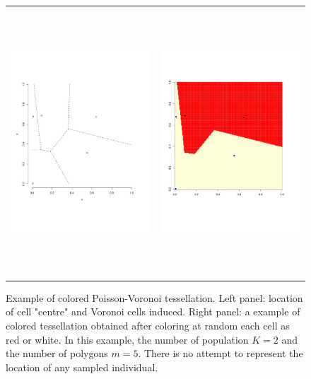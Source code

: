 \documentclass{article}
\begin{document}
\begin{figure}[h]
\vspace{-1cm}
\begin{tabular}{cc}
\vspace{-1cm}
\includegraphics[height=10cm,width=7.5cm]{../inst/images/vor1.jpeg} & \includegraphics[height=10cm,width=7.5cm]{../inst/images/vor2.jpeg}
\end{tabular}
\caption{Example of colored Poisson-Voronoi tessellation. Left panel: location of cell "centre" and Voronoi cells induced. 
Right panel: a example of colored tessellation obtained after coloring at random each cell as red or white. 
In this example, the number of population $K=2$ and the number of polygons $m=5$.
There is no attempt to represent the location of any sampled individual.}\label{fig:vor}
\end{figure}
\end{document}
